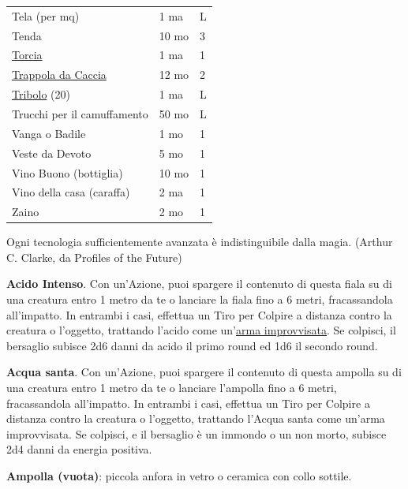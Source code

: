 \begin{multicols}{2}
\begin{tabular}{p{5.1cm}p{1.5cm}p{0.7cm}}
Tela (per mq) & 1 ma & L \\
Tenda & 10 mo & 3 \\
\hyperlink{Torcia}{Torcia} & 1 ma & 1 \\
\hyperlink{Trappola da Caccia}{Trappola da Caccia} & 12 mo & 2\\
\hyperlink{Tribolo}{Tribolo} (20) & 1 ma & L \\
Trucchi per il camuffamento & 50 mo & L \\
Vanga o Badile & 1 mo & 1 \\
Veste da Devoto & 5 mo & 1 \\
Vino Buono (bottiglia) & 10 mo & 1 \\
Vino della casa (caraffa) & 2 ma & 1 \\
Zaino & 2 mo & 1 \\
\end{tabular}

\medskip

\begin{changemargin}{0.3cm}{0.3cm}\begin{enfasi}{
Ogni tecnologia sufficientemente avanzata è indistinguibile dalla magia. (Arthur C. Clarke, da Profiles of the Future)
}\end{enfasi}\end{changemargin}

\medskip

\textbf{Acido Intenso}\label{Acido Intenso}\hypertarget{Acido Intenso}{}. Con un'Azione, puoi spargere il contenuto di questa fiala su di una creatura entro 1 metro da te o lanciare la fiala fino a 6 metri, fracassandola all'impatto. In entrambi i casi, effettua un Tiro per Colpire a distanza contro la creatura o l'oggetto, trattando l'acido come un'\hyperlink{armaimprovvisata}{arma improvvisata}. Se colpisci, il bersaglio subisce 2d6 danni da acido il primo round ed 1d6 il secondo round.

\textbf{Acqua santa}\label{Acqua santa}\hypertarget{Acqua santa}{}. Con un'Azione, puoi spargere il contenuto di questa ampolla su di una creatura entro 1 metro da te o lanciare l'ampolla fino a 6 metri, fracassandola all'impatto. In entrambi i casi, effettua un Tiro per Colpire a distanza contro la creatura o l'oggetto, trattando l'Acqua santa come un'arma improvvisata. Se colpisci, e il bersaglio è un immondo o un non morto, subisce 2d4 danni da energia positiva.

\textbf{Ampolla (vuota)}: piccola anfora in vetro o ceramica con collo sottile.


\end{multicols}
